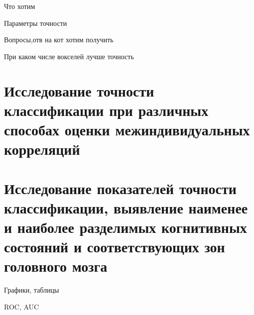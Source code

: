 Что хотим

Параметры точности

Вопросы,отв на кот хотим получить

При каком числе вокселей лучше точность

\section{Исследование точности классификации при различных	способах оценки межиндивидуальных корреляций}

\section{Исследование показателей точности классификации, выявление наименее и наиболее разделимых когнитивных состояний и соответствующих зон головного мозга}

Графики, таблицы

ROC, AUC
\